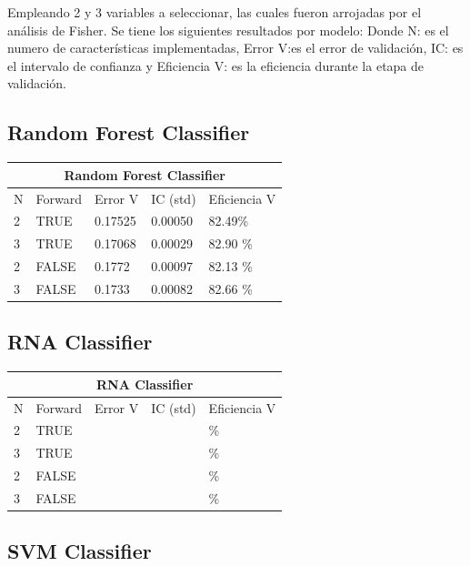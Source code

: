 \documentclass[conference]{IEEEtran}
\begin{document}
\newline
Empleando 2 y 3 variables a seleccionar, las cuales fueron arrojadas por el análisis de Fisher. Se tiene los siguientes resultados por modelo:
Donde N: es el numero de características implementadas, Error V:es el error de validación, IC: es el intervalo de confianza y Eficiencia V: es la eficiencia durante la etapa de validación.

\subsection{Random Forest Classifier}\hfill
\begin{table}[H]
\centering
\begin{tabular}{lllll}
\hline
\multicolumn{5}{c}{\textbf{Random Forest Classifier}} \\ \hline
N & Forward & Error V & IC (std) & Eficiencia V \\ \hline
2 & TRUE & 0.17525 & 0.00050  &82.49\% \\
3 & TRUE & 0.17068 & 0.00029  &82.90 \% \\
2 & FALSE & 0.1772 & 0.00097 & 82.13 \% \\
3 & FALSE & 0.1733  & 0.00082 & 82.66 \% \\ \hline
\end{tabular}
\end{table}

\subsection{RNA Classifier}\hfill

\begin{table}[h]
\centering
\begin{tabular}{lllll}
\hline
\multicolumn{5}{c}{\textbf{RNA Classifier}} \\ \hline
N & Forward & Error V & IC (std) & Eficiencia V \\ \hline
2 & TRUE &  &   & \% \\
3 & TRUE &  &   & \% \\
2 & FALSE & &  & \% \\
3 & FALSE &  & & \% \\ \hline
\end{tabular}
\end{table}

\subsection{SVM Classifier}\hfill
\end{document}
